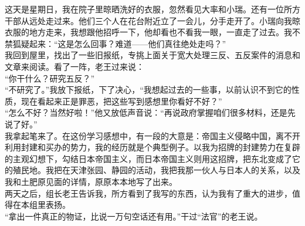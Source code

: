 这天是星期日，我在院子里晾晒洗好的衣服，忽然看见大率和小瑞。还有一位所方干部从远处走过来。他们三个人在花台附近立了一会儿，分手走开了。小瑞向我晾衣服的地方走来，我想跟他招呼一下，他却看也不看我一眼，一直走了过去。我不禁狐疑起来：“这是怎么回事？难道——他们真往绝处走吗？”\\

我回到屋里，找出了一些旧报纸，专挑上面关于宽大处理三反、五反案件的消息和文章来阅读。看了一阵，老王过来说：\\

“你干什么？研究五反？”\\

“不研究了。”我放下报纸，下了决心，“我想起过去的一些事，以前认识不到它的性质，现在看起来正是罪恶，把这些写到感想里你看好不好？”\\

“怎么不好？当然好啦！”他又放低声音说：“再说政府掌握咱们很多材料，还是先说了好。”\\

我拿起笔来了。在这份学习感想中，有一段的大意是：帝国主义侵略中国，离不开利用封建和买办的势力，我的经历就是个典型例子。以我为招牌的封建势力在复辟的主观幻想下，勾结日本帝国主义，而日本帝国主义则用这招牌，把东北变成了它的殖民地。我把在天津张园、静园的活动，我把我那一伙人与日本人的关系，以及我和土肥原见面的详情，原原本本地写了出来。\\

两天之后，组长老王告诉我，所方看到了我写的东西，认为我有了重大的进步，值得在本组里表扬。\\

“拿出一件真正的物证，比说一万句空话还有用。”干过“法官”的老王说。